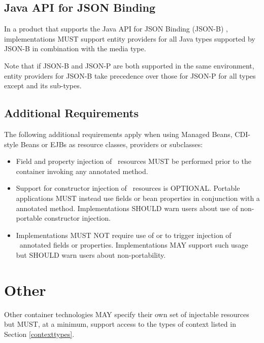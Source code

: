 \subsection{Java API for JSON Binding}
\label{jsonb}
In a product that supports the Java API for JSON Binding (JSON-B) \cite{jsonb}, 
implementations MUST support entity providers for all Java types supported by JSON-B in combination with the  media type.

Note that if JSON-B and JSON-P are both supported in the same environment, entity providers for JSON-B take precedence over those for JSON-P for all types except  and its sub-types.


\subsection{Additional Requirements}
\label{additional_reqs}

The following additional requirements apply when using Managed Beans, CDI-style Beans or EJBs as resource classes, providers or  subclasses:

\begin{itemize}
\item Field and property injection of \jaxrs\ resources MUST be performed prior to the container invoking any  annotated method.
\item Support for constructor injection of \jaxrs\ resources is OPTIONAL. Portable applications MUST instead use fields or bean properties in conjunction with a  annotated method. Implementations SHOULD warn users about use of non-portable constructor injection.
\item Implementations MUST NOT require use of  or  to trigger injection of \jaxrs\ annotated fields or properties. Implementations MAY support such usage but SHOULD warn users about non-portability.
\end{itemize}

\section{Other}

Other container technologies MAY specify their own set of injectable resources but MUST, at a minimum, support access to the types of context listed in Section \ref{contexttypes}.
